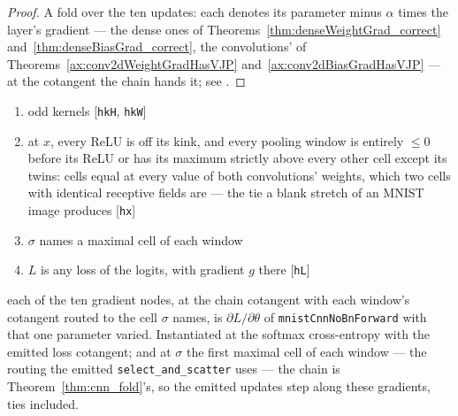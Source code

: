 \begin{proof}
\leanok
A fold over the ten updates: each denotes its parameter minus \(\alpha\)
times the layer's gradient --- the dense ones of
Theorems~\ref{thm:denseWeightGrad_correct} and~\ref{thm:denseBiasGrad_correct},
the convolutions' of Theorems~\ref{ax:conv2dWeightGradHasVJP}
and~\ref{ax:conv2dBiasGradHasVJP} --- at the cotangent the chain hands it;
see .
\end{proof}

\begin{theorem}
  \label{thm:cnn_loss_grad}
  \leanok
  \Assume{}
  \begin{enumerate}
    \item odd kernels \hfill[\texttt{hkH}, \texttt{hkW}]
    \item at \(x\), every ReLU is off its kink, and every pooling window is
          entirely \(\le 0\) before its ReLU or has its maximum strictly above
          every other cell except its twins: cells equal at every value of
          both convolutions' weights, which two cells with identical
          receptive fields are --- the tie a blank stretch of an MNIST image
          produces \hfill[\texttt{hx}]
    \item \(\sigma\) names a maximal cell of each window
    \item \(L\) is any loss of the logits, with gradient \(g\) there
          \hfill[\texttt{hL}]
  \end{enumerate}
  \Prove{} each of the ten gradient nodes, at the chain cotangent with each
  window's cotangent routed to the cell \(\sigma\) names, is
  \(\partial L/\partial\theta\) of \texttt{mnistCnnNoBnForward} with that one
  parameter varied. Instantiated at the softmax cross-entropy with the emitted
  loss cotangent; and at \(\sigma\) the first maximal cell of each window ---
  the routing the emitted \texttt{select\_and\_scatter} uses --- the chain is
  Theorem~\ref{thm:cnn_fold}'s, so the emitted updates step along these
  gradients, ties included.
\end{theorem}

